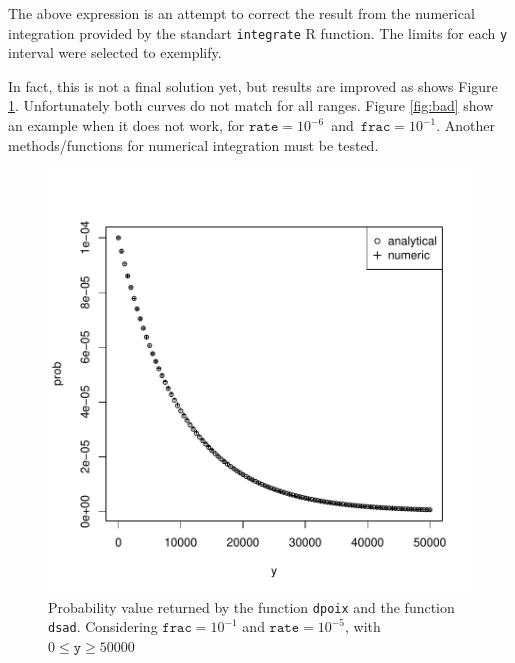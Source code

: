 \documentclass{article}
\newcommand{\code}[1]{\texttt{#1}}
\begin{document}
\begin{Schunk}
\end{Schunk}

The above expression is an attempt to correct the result from the numerical  integration provided by the standart \code{integrate} R function. The limits for each \code{y} interval were selected to exemplify.

In fact, this is not a final solution yet, but results are improved as shows Figure  \ref{fig:good}. Unfortunately both curves do not match for all ranges. Figure \ref{fig:bad} show an example when it does not work, for $\code{rate}=10^{-6}$\ and\ $\code{frac}=10^{-1}$. Another methods/functions for numerical integration must be tested.

\begin{figure}[ht]
  \begin{center}
\includegraphics{sads_tutorial-012}
\end{center}
\caption{Probability value returned by the function \code{dpoix} and the function \code{dsad}. Considering $\code{frac}=10^{-1}$ and $\code{rate}=10^{-5}$, with $0 \leq \code{y} \geq 50000$}
\label{fig:good}
\end{figure}
\end{document}
